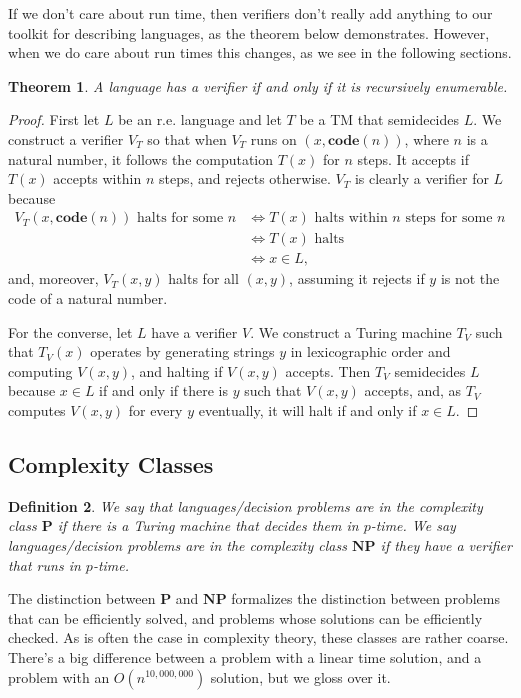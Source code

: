 \documentclass{article}
\theoremstyle{plain}
\newtheorem{theorem}{Theorem}[section]{\bfseries}{\itshape}
\newtheorem{definition}[theorem]{Definition}{\bfseries}{\upshape}
\theoremstyle{definition}
\newcommand{\co}{\mathbf{code}}
\newcommand{\Po}{\mathbf{P}}
\newcommand{\NP}{\mathbf{NP}}
\begin{document}
If we don't care about run time, then verifiers don't really add anything to our toolkit for describing languages, as the theorem below demonstrates. However, when we do care about run times this changes, as we see in the following sections.
\begin{theorem}
A language has a verifier if and only if it is recursively enumerable.
\end{theorem}
\begin{proof}
First let $L$ be an r.e. language and let $T$ be a TM that semidecides $L$. We construct a verifier $V_T$ so that when $V_T$ runs on $(x,\co(n))$, where $n$ is a natural number, it follows the computation $T(x)$ for $n$ steps. It accepts if $T(x)$ accepts within $n$ steps, and rejects otherwise. $V_T$ is clearly a verifier for $L$ because 
\begin{align*}
V_T(x,\co(n))\text{ halts for some }n & \iff T(x)\text{ halts within $n$ steps for some $n$}\\
&\iff T(x) \text{ halts}\\
& \iff x\in L,
\end{align*}
and, moreover, $V_T(x,y)$ halts for all $(x,y)$, assuming it rejects if $y$ is not the code of a natural number. 

For the converse, let $L$ have a verifier $V$. We construct a Turing machine $T_V$ such that $T_V(x)$ operates by generating strings $y$ in lexicographic order and computing $V(x,y)$, and halting if $V(x,y)$ accepts. Then $T_V$ semidecides $L$ because $x\in L$ if and only if there is $y$ such that $V(x,y)$ accepts, and, as $T_V$ computes $V(x,y)$ for every $y$ eventually, it will halt if and only if $x\in L$.   
\end{proof}


\subsection{Complexity Classes}
\begin{definition}
We say that languages/decision problems are in the complexity class $\Po$ if there is a Turing machine that decides them in $p$-time. We say languages/decision problems are in the complexity class $\NP$ if they have a verifier that runs in $p$-time.
\end{definition}

The distinction between $\Po$ and $\NP$ formalizes the distinction between problems that can be efficiently solved, and problems whose solutions can be efficiently checked. As is often the case in complexity theory, these classes are rather coarse. There's a big difference between a problem with a linear time solution, and a problem with an $O(n^{10,000,000})$ solution, but we gloss over it.
\end{document}
